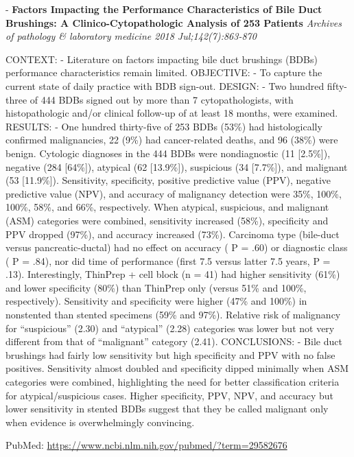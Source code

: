 \documentclass[]{article}
\begin{document}
 - \textbf{Factors Impacting the Performance Characteristics of Bile
Duct Brushings: A Clinico-Cytopathologic Analysis of 253 Patients}
\emph{Archives of pathology \& laboratory medicine 2018
Jul;142(7):863-870}

CONTEXT: - Literature on factors impacting bile duct brushings (BDBs)
performance characteristics remain limited. OBJECTIVE: - To capture the
current state of daily practice with BDB sign-out. DESIGN: - Two hundred
fifty-three of 444 BDBs signed out by more than 7 cytopathologists, with
histopathologic and/or clinical follow-up of at least 18 months, were
examined. RESULTS: - One hundred thirty-five of 253 BDBs (53\%) had
histologically confirmed malignancies, 22 (9\%) had cancer-related
deaths, and 96 (38\%) were benign. Cytologic diagnoses in the 444 BDBs
were nondiagnostic (11 {[}2.5\%{]}), negative (284 {[}64\%{]}), atypical
(62 {[}13.9\%{]}), suspicious (34 {[}7.7\%{]}), and malignant (53
{[}11.9\%{]}). Sensitivity, specificity, positive predictive value
(PPV), negative predictive value (NPV), and accuracy of malignancy
detection were 35\%, 100\%, 100\%, 58\%, and 66\%, respectively. When
atypical, suspicious, and malignant (ASM) categories were combined,
sensitivity increased (58\%), specificity and PPV dropped (97\%), and
accuracy increased (73\%). Carcinoma type (bile-duct versus
pancreatic-ductal) had no effect on accuracy ( P = .60) or diagnostic
class ( P = .84), nor did time of performance (first 7.5 versus latter
7.5 years, P = .13). Interestingly, ThinPrep + cell block (n = 41) had
higher sensitivity (61\%) and lower specificity (80\%) than ThinPrep
only (versus 51\% and 100\%, respectively). Sensitivity and specificity
were higher (47\% and 100\%) in nonstented than stented specimens (59\%
and 97\%). Relative risk of malignancy for ``suspicious'' (2.30) and
``atypical'' (2.28) categories was lower but not very different from
that of ``malignant'' category (2.41). CONCLUSIONS: - Bile duct
brushings had fairly low sensitivity but high specificity and PPV with
no false positives. Sensitivity almost doubled and specificity dipped
minimally when ASM categories were combined, highlighting the need for
better classification criteria for atypical/suspicious cases. Higher
specificity, PPV, NPV, and accuracy but lower sensitivity in stented
BDBs suggest that they be called malignant only when evidence is
overwhelmingly convincing.

PubMed: \url{https://www.ncbi.nlm.nih.gov/pubmed/?term=29582676}

{}
\end{document}
